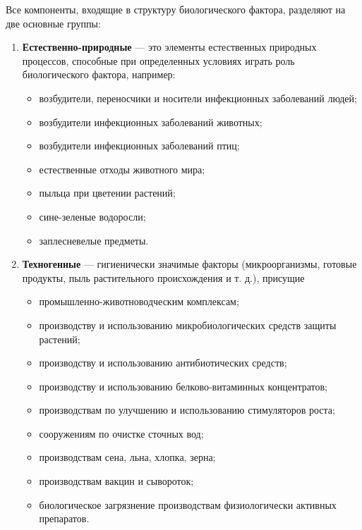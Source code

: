 \documentclass[a4paper, 12pt]{extarticle}
\begin{document}
Все компоненты, входящие в структуру биологического фактора, разделяют на две основные группы:
\begin{enumerate}
    \item \textbf{Естественно-природные} --- это элементы естественных природных процессов, способные при определенных условиях играть роль биологического фактора, например:
          \begin{itemize}
              \item возбудители, переносчики и носители инфекционных заболеваний людей;
              \item возбудители инфекционных заболеваний животных;
              \item возбудители инфекционных заболеваний птиц;
              \item естественные отходы животного мира;
              \item пыльца при цветении растений;
              \item сине-зеленые водоросли;
              \item заплесневелые предметы.
          \end{itemize}
    \item \textbf{Техногенные} --- гигиенически значимые факторы (микроорганизмы, готовые продукты, пыль растительного происхождения и т. д.), присущие
          \begin{itemize}
              \item промышленно-животноводческим комплексам;
              \item производству и использованию микробиологических средств защиты растений;
              \item производству и использованию антибиотических средств;
              \item производству и использованию белково-витаминных концентратов;
              \item производствам по улучшению и использованию стимуляторов роста;
              \item сооружениям по очистке сточных вод;
              \item производствам сена, льна, хлопка, зерна;
              \item производствам вакцин и сывороток;
              \item биологическое загрязнение производствам физиологически активных препаратов.
          \end{itemize}
\end{enumerate}
\end{document}

